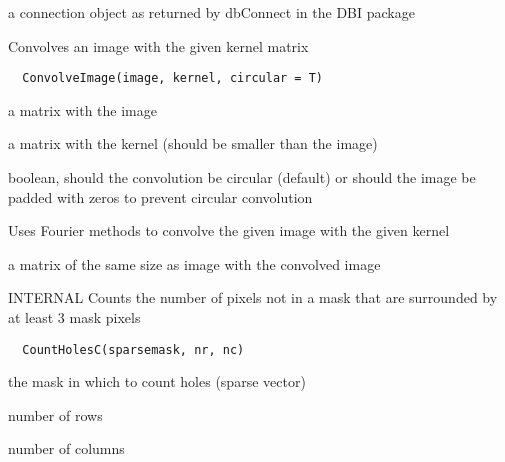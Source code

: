 \documentclass[a4paper]{book}
\begin{document}
%
\begin{Value}
a connection object as returned by dbConnect in the DBI
package
\end{Value}
%
\begin{Description}\relax
Convolves an image with the given kernel matrix
\end{Description}
%
\begin{Usage}
\begin{verbatim}
  ConvolveImage(image, kernel, circular = T)
\end{verbatim}
\end{Usage}
%
\begin{Arguments}
\begin{ldescription}
\item[\code{image}] a matrix with the image

\item[\code{kernel}] a matrix with the kernel (should be smaller
than the image)

\item[\code{circular}] boolean, should the convolution be
circular (default) or should the image be padded with
zeros to prevent circular convolution
\end{ldescription}
\end{Arguments}
%
\begin{Details}\relax
Uses Fourier methods to convolve the given image with the
given kernel
\end{Details}
%
\begin{Value}
a matrix of the same size as image with the convolved
image
\end{Value}
%
\begin{Description}\relax
INTERNAL Counts the number of pixels not in a mask that
are surrounded by at least 3 mask pixels
\end{Description}
%
\begin{Usage}
\begin{verbatim}
  CountHolesC(sparsemask, nr, nc)
\end{verbatim}
\end{Usage}
%
\begin{Arguments}
\begin{ldescription}
\item[\code{sparsemask}] the mask in which to count holes
(sparse vector)

\item[\code{nr}] number of rows

\item[\code{nc}] number of columns
\end{ldescription}
\end{Arguments}
\end{document}
